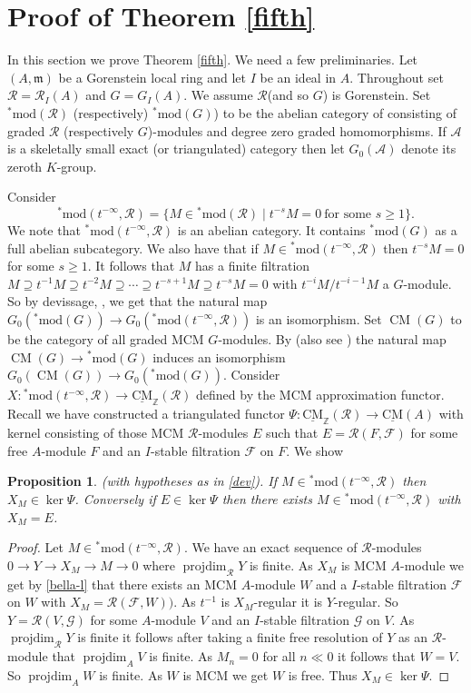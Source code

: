 \documentclass{amsart}
\newcommand{\m}{\mathfrak{m} }
\newcommand{\Z}{\mathbb{Z} }
\newcommand{\eR}{\mathcal{R} }
\newcommand{\Fc}{\mathcal{F} }
\newcommand{\Gc}{\mathcal{G} }
\newcommand{\rt}{\rightarrow}
\newcommand{\CMS}{\operatorname{\underline{CM}}}
\newcommand{\CMa}{\operatorname{CM}}
\newcommand{\projdim}{\operatorname{projdim}}
\newcommand{\smod}{\operatorname{^*mod}}
\theoremstyle{plain}
\newtheorem{proposition}[theorem]{Proposition}
\theoremstyle{definition}
\theoremstyle{remark}
\begin{document}
{\section{Proof of Theorem \ref{fifth}}
In this section we prove Theorem \ref{fifth}. We need a few preliminaries.
Let $(A,\m)$ be a Gorenstein local ring and let $I$ be an ideal in $A$.
Throughout  set  $\eR = \eR_I(A)$ and $G = G_I(A)$. We assume $\eR$(and so $G$) is Gorenstein. Set $\smod(\eR)$ (respectively) $\smod(G)$) to be the abelian category of consisting of graded $\eR$ (respectively $G$)-modules and degree zero graded homomorphisms. If $\mathcal{A}$ is a skeletally small exact (or triangulated) category  then let $G_0(\mathcal{A})$ denote its zeroth $K$-group.

\s\label{dev} Consider
$$\smod(t^{-\infty}, \eR) = \{ M \in \smod(\eR) \mid t^{-s}M = 0 \ \text{for some $s \geq 1$}\}. $$
We note that $\smod(t^{-\infty}, \eR)$ is an abelian category. It contains $\smod(G)$ as a full abelian subcategory. We also have that if $M \in \smod(t^{-\infty}, \eR)$ then $t^{-s}M = 0$ for some $s \geq 1$. It follows that $M$ has a finite filtration $M \supseteq t^{-1}M \supseteq t^{-2} M \supseteq \cdots \supseteq t^{-s + 1}M \supseteq t^{-s}M = 0$ with $t^{-i}M/t^{-i-1}M$ a $G$-module. So by devissage,  \cite[Chapter II, 6.3]{W}, we get that the natural map $G_0(\smod(G)) \rt G_0(\smod(t^{-\infty}, \eR))$ is an isomorphism.
Set $\CMa(G)$ to be the category of all graded  MCM $G$-modules. By \cite[13.2]{Y} (also see \cite[Chapter II, 7.6]{W}) the natural map $\CMa(G) \rt \smod(G)$ induces an isomorphism $G_0(\CMa(G)) \rt G_0(\smod(G))$.
\s \label{map} Consider $X \colon \smod(t^{-\infty},\eR) \rt \CMS_\Z(\eR) $ defined by the MCM approximation functor. Recall we have constructed a triangulated functor $\Psi \colon \CMS_\Z(\eR) \rt \CMS(A)$
with kernel consisting of those MCM $\eR$-modules $E$ such that $E = \eR(F,\Fc)$ for some free $A$-module $F$ and an $I$-stable filtration $\Fc$ on $F$. We show
\begin{proposition}\label{utah}
(with hypotheses as in \ref{dev}). If $M \in \smod(t^{-\infty}, \eR)$ then $X_M \in \ker \Psi$. Conversely if $E \in \ker \Psi$ then there exists $M \in \smod(t^{-\infty}, \eR)$ with $X_M = E$.
\end{proposition}
\begin{proof}
  Let $M \in \smod(t^{-\infty}, \eR)$. We have an exact sequence of $\eR$-modules $0 \rt Y \rt X_M \rt M\rt 0$ where $\projdim_{\eR} Y$ is finite. As $X_M$ is MCM $A$-module we get by \ref{bella-l} that there exists an MCM $A$-module $W$ and a $I$-stable filtration $\Fc$ on $W$  with $X_M = \eR( \Fc, W))$. As $t^{-1}$ is $X_M$-regular it is $Y$-regular. So $Y = \eR(V,\Gc)$ for some $A$-module $V$ and an $I$-stable filtration $\Gc$ on $V$. As $\projdim_{\eR}Y$ is finite it follows after taking a finite free resolution of $Y$ as an $\eR$-module  that $\projdim_A V$ is finite. As $M_n  = 0$ for all $n \ll 0$ it follows that $W = V$. So $\projdim_A W$ is finite. As $W$ is MCM we get $W$ is free. Thus $X_M \in \ker \Psi$.


\end{proof}}
\end{document}
